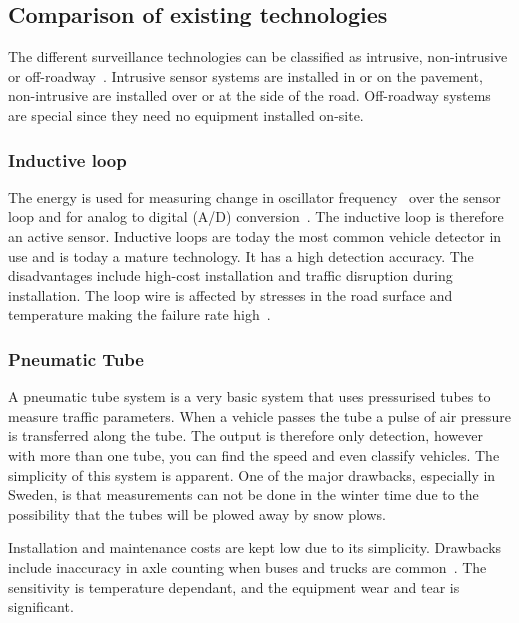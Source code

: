 
\subsection{Comparison of existing technologies}
The different surveillance technologies can be classified as intrusive, non-intrusive or off-roadway~\cite{path2007}. Intrusive sensor systems are installed in or on the pavement, non-intrusive are installed over or at the side of the road. Off-roadway systems are special since they need no equipment installed on-site.

\subsubsection{Inductive loop}
The energy is used for measuring change in oscillator frequency~\cite{path2007} over the sensor loop and for analog to digital (A/D) conversion~\cite{cheung2005-2}. The inductive loop is therefore an active sensor. Inductive loops are today the most common vehicle detector in use and is today a mature technology. It has a high detection accuracy. The disadvantages include high-cost installation and traffic disruption during installation. The loop wire is affected by stresses in the road surface and temperature making the failure rate high~\cite{path2007}.

\subsubsection{Pneumatic Tube}
A pneumatic tube system is a very basic system that uses pressurised tubes to measure traffic parameters. When a vehicle passes the tube a pulse of air pressure is transferred along the tube. The output is therefore only detection, however with more than one tube, you can find the speed and even classify vehicles. The simplicity of this system is apparent. One of the major drawbacks, especially in Sweden, is that measurements can not be done in the winter time due to the possibility that the tubes will be plowed away by snow plows.

Installation and maintenance costs are kept low due to its simplicity. Drawbacks include inaccuracy in axle counting when buses and trucks are common~\cite{path2007}. The sensitivity is temperature dependant, and the equipment wear and tear is significant. 

